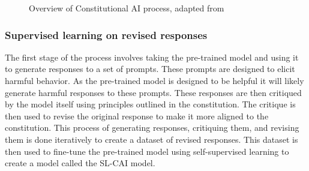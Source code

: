 \begin{figure}[h!]

    \caption{Overview of Constitutional AI process, adapted from \cite{baiConstitutionalAIHarmlessness2022}}
    \label{fig:cai_process}
\end{figure}

\subsubsection{Supervised learning on revised responses}

The first stage of the process involves taking the pre-trained model and using it to generate responses to a set of prompts. These prompts are designed to elicit harmful behavior. As the pre-trained model is designed to be helpful it will likely generate harmful responses to these prompts. These responses are then critiqued by the model itself using principles outlined in the constitution. The critique is then used to revise the original response to make it more aligned to the constitution. This process of generating responses, critiquing them, and revising them is done iteratively to create a dataset of revised responses. This dataset is then used to fine-tune the pre-trained model using self-supervised learning to create a model called the SL-CAI model.

